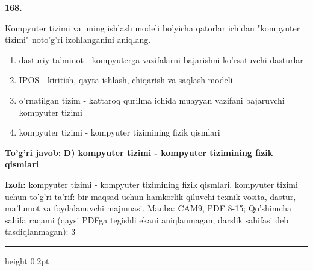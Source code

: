 \documentclass[10pt,a4paper]{article}
\begin{document}
{\bfseries\sffamily\color{ink} 168.}
\par
Kompyuter tizimi va uning ishlash modeli bo'yicha qatorlar ichidan "kompyuter tizimi" noto'g'ri izohlanganini aniqlang.
\begin{enumerate}[label=\Alph*),leftmargin=9mm]
\item dasturiy ta'minot - kompyuterga vazifalarni bajarishni ko'rsatuvchi dasturlar
\item IPOS - kiritish, qayta ishlash, chiqarish va saqlash modeli
\item o'rnatilgan tizim - kattaroq qurilma ichida muayyan vazifani bajaruvchi kompyuter tizimi
\item kompyuter tizimi - kompyuter tizimining fizik qismlari
\end{enumerate}
\begin{tcolorbox}[enhanced,breakable,colback=teal!4,colframe=teal!60!black,boxrule=0.45pt,arc=1.2mm,left=2.7mm,right=2.7mm,top=1.8mm,bottom=1.8mm,before skip=2mm,after skip=2mm]
{\bfseries\sffamily\color{teal}To'g'ri javob:} \textbf{D) kompyuter tizimi - kompyuter tizimining fizik qismlari}
\par\smallskip
{\bfseries Izoh:} kompyuter tizimi - kompyuter tizimining fizik qismlari. kompyuter tizimi uchun to'g'ri ta'rif: bir maqsad uchun hamkorlik qiluvchi texnik vosita, dastur, ma'lumot va foydalanuvchi majmuasi. Manba: CAM9, PDF 8-15; Qo'shimcha sahifa raqami (qaysi PDFga tegishli ekani aniqlanmagan; darslik sahifasi deb tasdiqlanmagan): 3
\end{tcolorbox}
\vspace{2mm}\hrule height 0.2pt\vspace{3mm}
\end{document}
